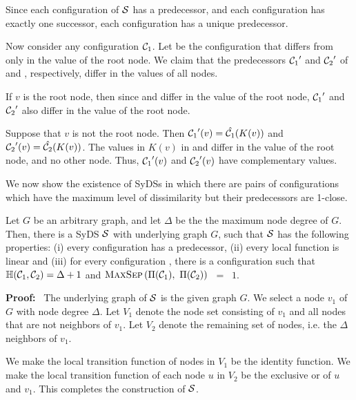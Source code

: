 Since each configuration of $\mbox{$\mathcal{S}$}${}  has a predecessor, 
and each configuration has exactly one successor,
each configuration has a unique predecessor.

Now consider any configuration $\mbox{$\mathcal{C}_{1}$}$.
Let \calctwo{} be the configuration that differs from 
\calcone{} only in the value of the root node.
We claim that the predecessors $\mbox{$\mathcal{C}_{1}$}'$ and $\mbox{$\mathcal{C}_{2}$}'$
of \calcone{} and \calctwo{}, respectively, 
differ in the values of all nodes.

If $v$ is the root node, then since \calcone{} and \calctwo{} 
differ in the value of the root node,
$\mbox{$\mathcal{C}_{1}$}'$ and $\mbox{$\mathcal{C}_{2}$}'$ also differ in the value of the root node.

Suppose that $v$ is not the root node.
Then $\mbox{$\mathcal{C}_{1}$}'(v) = \hat{\mbox{$\mathcal{C}_{1}$}}(K(v))$ and $\mbox{$\mathcal{C}_{2}$}'(v) = \hat{\mbox{$\mathcal{C}_{2}$}}(K(v))$.
The values in $K(v)$ in \calcone{} and \calctwo{} differ 
in the value of the root node, and no other node.
Thus, $\mbox{$\mathcal{C}_{1}$}'(v)$ and $\mbox{$\mathcal{C}_{2}$}'(v)$ have complementary values. \QED

\smallskip
We now show the existence of SyDSs in which there 
are pairs of configurations which have the maximum level 
of dissimilarity but their predecessors are 1-close. 

\begin{proposition}\label{pro:far-close-degree}
Let $G$ be an arbitrary graph, 
and let $\Delta$ be the the maximum node degree of $G$.
Then, there is a SyDS $\mbox{$\mathcal{S}$}${} with underlying graph $G$,
such that $\mbox{$\mathcal{S}$}${} has the following properties: 
(i) every configuration has a predecessor, 
(ii) every local function is linear and
(iii) for every configuration
\calcone{}, there is a configuration \calctwo{} such that 
 $\mbox{$\mathbb{H}$}(\mbox{$\mathcal{C}_{1}$}, \mbox{$\mathcal{C}_{2}$}) = \Delta + 1$  and 
$\mbox{\textsc{MaxSep}}\left( \mbox{$\Pi(\mbox{$\mathcal{C}_{1}$})$},~ \mbox{$\Pi(\mbox{$\mathcal{C}_{2}$})$} \right)$ ~=~ $1$.
\end{proposition}

\noindent
\textbf{Proof:}~ 
The underlying graph of $\mbox{$\mathcal{S}$}${}  is the given graph $G$.
We select a node $v_1$ of $G$ with node degree $\Delta$.
Let $V_1$ denote the node set consisting of $v_1$ and all nodes that are not neighbors of $v_1$.
Let $V_2$ denote the remaining set of nodes, i.e. the $\Delta$ neighbors of $v_1$.

We make the local transition function of nodes in $V_1$ be the identity function.  
We make the local transition function of each node $u$ in $V_2$ 
be the exclusive or of $u$ and $v_1$.
This completes the construction of $\mbox{$\mathcal{S}$}${}.


